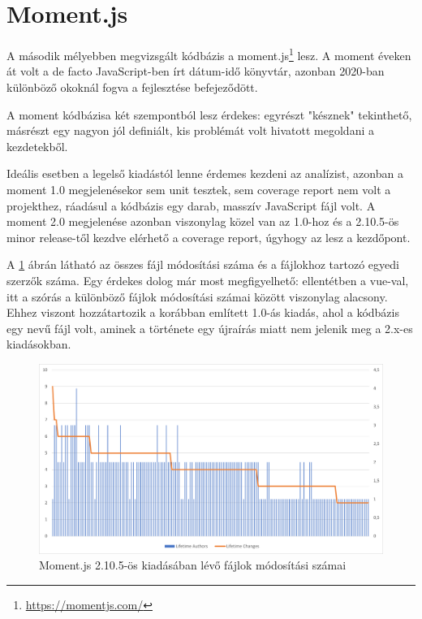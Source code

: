 \section{Moment.js}

A második mélyebben megvizsgált kódbázis a moment.js\footnote{\url{https://momentjs.com/}} lesz. A moment éveken át volt a de facto JavaScript-ben írt dátum-idő könyvtár, azonban 2020-ban különböző okoknál fogva a fejlesztése befejeződött.

A moment kódbázisa két szempontból lesz érdekes: egyrészt "késznek" tekinthető, másrészt egy nagyon jól definiált, kis problémát volt hivatott megoldani a kezdetekből.

Ideális esetben a legelső kiadástól lenne érdemes kezdeni az analízist, azonban a moment 1.0 megjelenésekor sem unit tesztek, sem coverage report nem volt a projekthez, ráadásul a kódbázis egy darab, masszív JavaScript fájl volt. A moment 2.0 megjelenése azonban viszonylag közel van az 1.0-hoz és a 2.10.5-ös minor release-től kezdve elérhető a coverage report, úgyhogy az lesz a kezdőpont.

A \ref{fig:moment-2.10.1-changes} ábrán látható az összes fájl módosítási száma és a fájlokhoz tartozó egyedi szerzők száma. Egy érdekes dolog már most megfigyelhető: ellentétben a vue-val, itt a szórás a különböző fájlok módosítási számai között viszonylag alacsony. Ehhez viszont hozzátartozik a korábban említett 1.0-ás kiadás, ahol a kódbázis egy  nevű fájl volt, aminek a története egy újraírás miatt nem jelenik meg a 2.x-es kiadásokban.

\begin{figure}[H]
    \centering
    \includegraphics[width=1\textwidth]{images/moment/moment-2.10.5-changes.png}
    \caption{Moment.js 2.10.5-ös kiadásában lévő fájlok módosítási számai}
    \label{fig:moment-2.10.1-changes}
\end{figure}

